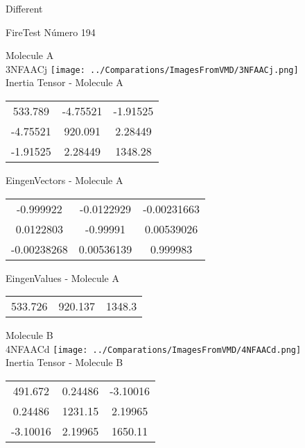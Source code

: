 \begin{center}
\vtab
\vtab
\textcolor{NavyBlue}{\Large Different}
\end{center}

 \newpage

\vtab[-2cm]
\begin{center}
{\large FireTest \tab Número 194}
\end{center}
\begin{multicols}{2}
\begin{center}

Molecule A \\ 
3NFAACj
\texttt{[image: ../Comparations/ImagesFromVMD/3NFAACj.png]}
\\
Inertia Tensor - Molecule A \\
\vtab

\begin{tabular}{|c c c|}
533.789	 & 	-4.75521	 & 	-1.91525	 \\
-4.75521	 & 	920.091	 & 	2.28449	 \\
-1.91525	 & 	2.28449	 & 	1348.28
\end{tabular}

\vtab
 EingenVectors - Molecule A     \\
\vtab
\begin{tabular}{|c c c|}
-0.999922	 & 	-0.0122929	 & 	-0.00231663	 \\
0.0122803	 & 	-0.99991	 & 	0.00539026	 \\
-0.00238268	 & 	0.00536139	 & 	0.999983
\end{tabular}

\vtab
 EingenValues - Molecule A     \\
\vtab
\begin{tabular}{|c c c|}
533.726	 & 	920.137	 & 	1348.3	 \\
\end{tabular}
\columnbreak

Molecule B \\ 
4NFAACd
\texttt{[image: ../Comparations/ImagesFromVMD/4NFAACd.png]}
\\
Inertia Tensor - Molecule B \\
\vtab

\begin{tabular}{|c c c|}
491.672	 & 	0.24486	 & 	-3.10016	 \\
0.24486	 & 	1231.15	 & 	2.19965	 \\
-3.10016	 & 	2.19965	 & 	1650.11
\end{tabular}


\end{center}
\end{multicols}
